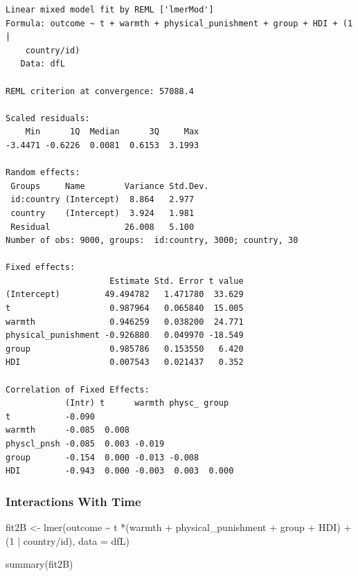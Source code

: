 \documentclass[
  letterpaper,
  DIV=11,
  numbers=noendperiod]{scrreprt}
\newenvironment{Shaded}{\begin{snugshade}}{\end{snugshade}}
\newcommand{\AttributeTok}[1]{\textcolor[rgb]{0.40,0.45,0.13}{#1}}
\newcommand{\DecValTok}[1]{\textcolor[rgb]{0.68,0.00,0.00}{#1}}
\newcommand{\FunctionTok}[1]{\textcolor[rgb]{0.28,0.35,0.67}{#1}}
\newcommand{\NormalTok}[1]{\textcolor[rgb]{0.00,0.23,0.31}{#1}}
\newcommand{\OtherTok}[1]{\textcolor[rgb]{0.00,0.23,0.31}{#1}}
\newcommand{\SpecialCharTok}[1]{\textcolor[rgb]{0.37,0.37,0.37}{#1}}
\begin{document}
\begin{verbatim}
Linear mixed model fit by REML ['lmerMod']
Formula: outcome ~ t + warmth + physical_punishment + group + HDI + (1 |  
    country/id)
   Data: dfL

REML criterion at convergence: 57088.4

Scaled residuals: 
    Min      1Q  Median      3Q     Max 
-3.4471 -0.6226  0.0081  0.6153  3.1993 

Random effects:
 Groups     Name        Variance Std.Dev.
 id:country (Intercept)  8.864   2.977   
 country    (Intercept)  3.924   1.981   
 Residual               26.008   5.100   
Number of obs: 9000, groups:  id:country, 3000; country, 30

Fixed effects:
                     Estimate Std. Error t value
(Intercept)         49.494782   1.471780  33.629
t                    0.987964   0.065840  15.005
warmth               0.946259   0.038200  24.771
physical_punishment -0.926880   0.049970 -18.549
group                0.985786   0.153550   6.420
HDI                  0.007543   0.021437   0.352

Correlation of Fixed Effects:
            (Intr) t      warmth physc_ group 
t           -0.090                            
warmth      -0.085  0.008                     
physcl_pnsh -0.085  0.003 -0.019              
group       -0.154  0.000 -0.013 -0.008       
HDI         -0.943  0.000 -0.003  0.003  0.000
\end{verbatim}

\subsubsection{Interactions With Time}\label{interactions-with-time-1}

\begin{Shaded}
\begin{Highlighting}[]
\NormalTok{fit2B }\OtherTok{\textless{}{-}} \FunctionTok{lmer}\NormalTok{(outcome }\SpecialCharTok{\textasciitilde{}}\NormalTok{ t }\SpecialCharTok{*}\NormalTok{(warmth }\SpecialCharTok{+}\NormalTok{ physical\_punishment }\SpecialCharTok{+} 
\NormalTok{               group }\SpecialCharTok{+}\NormalTok{ HDI) }\SpecialCharTok{+}
\NormalTok{               (}\DecValTok{1} \SpecialCharTok{|}\NormalTok{ country}\SpecialCharTok{/}\NormalTok{id),}
             \AttributeTok{data =}\NormalTok{ dfL)}

\FunctionTok{summary}\NormalTok{(fit2B)}
\end{Highlighting}
\end{Shaded}
\end{document}
